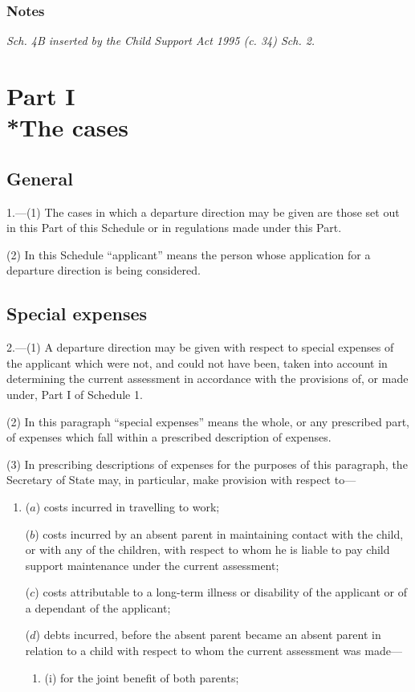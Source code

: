 \documentclass[a4paper]{article}
\newcommand{\parthead}{}
\newcommand\amendment[1]{\subsubsection*{Notes}{\itshape\frenchspacing\footnotesize #1 \par}}
\begin{document}
{\amendment{
Sch. 4B inserted by the Child Support Act 1995 (c. 34) Sch. 2.
}

\section[Part I --- The cases]{Part I\\*The cases}

\renewcommand\parthead{--- Schedule 4B Part I}

\subsection*{General}

1.—(1) The cases in which a departure direction may be given are those set out in this Part of this Schedule or in regulations made under this Part.

(2) In this Schedule “applicant” means the person whose application for a departure direction is being considered.

\subsection*{Special expenses}

2.—(1) A departure direction may be given with respect to special expenses of the applicant which were not, and could not have been, taken into account in determining the current assessment in accordance with the provisions of, or made under, Part I of Schedule 1.

(2)
In this paragraph “special expenses” means the whole, or any prescribed part, of expenses which fall within a prescribed description of expenses.

(3)
In prescribing descriptions of expenses for the purposes of this paragraph, the Secretary of State may, in particular, make provision with respect to---
\begin{enumerate}\item[]
($a$) costs incurred in travelling to work;

($b$) costs incurred by an absent parent in maintaining contact with the child, or
with any of the children, with respect to whom he is liable to pay child
support maintenance under the current assessment;

($c$) costs attributable to a long-term illness or disability of the applicant or of a
dependant of the applicant;

($d$) debts incurred, before the absent parent became an absent parent in relation
to a child with respect to whom the current assessment was made---
\begin{enumerate}\item[]
(i)
for the joint benefit of both parents;


\end{enumerate}
\end{enumerate}}
\end{document}
